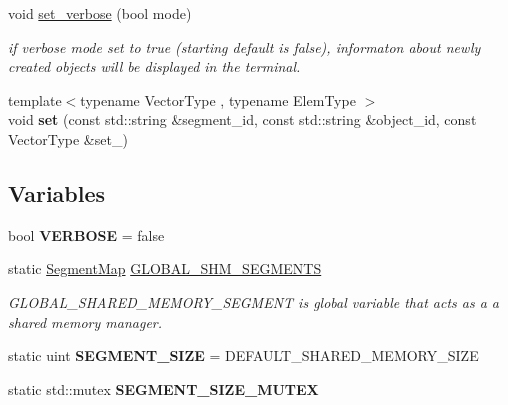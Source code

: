 \begin{DoxyCompactItemize}
void \hyperlink{namespaceshared__memory_afe26d531f043f59bb36ea7816b8a40bf}{set\+\_\+verbose} (bool mode)
\begin{DoxyCompactList}\small\item\em if verbose mode set to true (starting default is false), informaton about newly created objects will be displayed in the terminal. \end{DoxyCompactList}\item 
\mbox{\label{namespaceshared__memory_a653947408c221da4e2c26439ba913f8d}} 
{\footnotesize template$<$typename Vector\+Type , typename Elem\+Type $>$ }\\void {\bfseries set} (const std\+::string \&segment\+\_\+id, const std\+::string \&object\+\_\+id, const Vector\+Type \&set\+\_\+)
\end{DoxyCompactItemize}
\subsection*{Variables}
\begin{DoxyCompactItemize}
\item 
\mbox{\label{namespaceshared__memory_adb7d7158652e09188fea583e05949bb5}} 
bool {\bfseries V\+E\+R\+B\+O\+SE} = false
\item 
static \hyperlink{namespaceshared__memory_a9aeebdfb6185497cac7c093cf3d765c5}{Segment\+Map} \hyperlink{namespaceshared__memory_ad1f78482aa062e165f37fd49e2e8f539}{G\+L\+O\+B\+A\+L\+\_\+\+S\+H\+M\+\_\+\+S\+E\+G\+M\+E\+N\+TS}
\begin{DoxyCompactList}\small\item\em G\+L\+O\+B\+A\+L\+\_\+\+S\+H\+A\+R\+E\+D\+\_\+\+M\+E\+M\+O\+R\+Y\+\_\+\+S\+E\+G\+M\+E\+NT is global variable that acts as a a shared memory manager. \end{DoxyCompactList}\item 
\mbox{\label{namespaceshared__memory_a1aa02b0b88f0045c3711029f882d80fa}} 
static uint {\bfseries S\+E\+G\+M\+E\+N\+T\+\_\+\+S\+I\+ZE} = D\+E\+F\+A\+U\+L\+T\+\_\+\+S\+H\+A\+R\+E\+D\+\_\+\+M\+E\+M\+O\+R\+Y\+\_\+\+S\+I\+ZE
\item 
\mbox{\label{namespaceshared__memory_a5c687b65860cde45c62305fbb7a19e71}} 
static std\+::mutex {\bfseries S\+E\+G\+M\+E\+N\+T\+\_\+\+S\+I\+Z\+E\+\_\+\+M\+U\+T\+EX}
\end{DoxyCompactItemize}


